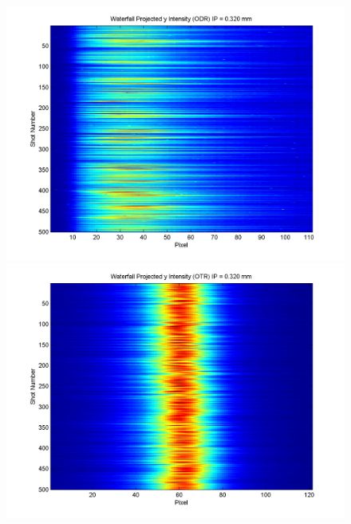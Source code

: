 \documentclass[12pt]{article}
\begin{document}
\begin{figure}
\begin{center}
\includegraphics[scale=0.5]{Figures/ProjY_wfall_ODR_320.PNG}
\includegraphics[scale=0.5]{Figures/ProjY_wfall_OTR_320.PNG}
\caption{}
\end{center}
\end{figure}
\end{document}
